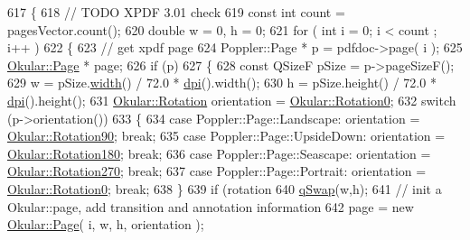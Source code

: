 \begin{DoxyCode}
617 \{
618     \textcolor{comment}{// TODO XPDF 3.01 check}
619     \textcolor{keyword}{const} \textcolor{keywordtype}{int} count = pagesVector.count();
620     \textcolor{keywordtype}{double} w = 0, h = 0;
621     \textcolor{keywordflow}{for} ( \textcolor{keywordtype}{int} i = 0; i < count ; i++ )
622     \{
623         \textcolor{comment}{// get xpdf page}
624         Poppler::Page * p = pdfdoc->page( i );
625         \hyperlink{classOkular_1_1Page}{Okular::Page} * page;
626         \textcolor{keywordflow}{if} (p)
627         \{
628             \textcolor{keyword}{const} QSizeF pSize = p->pageSizeF();
629             w = pSize.\hyperlink{classOkular_1_1Page_a57114e88281da2a51b1bb0d5d4996d53}{width}() / 72.0 * \hyperlink{classOkular_1_1Generator_ad3dd14822e3f5c9d1785008a207f34fb}{dpi}().width();
630             h = pSize.height() / 72.0 * \hyperlink{classOkular_1_1Generator_ad3dd14822e3f5c9d1785008a207f34fb}{dpi}().height();
631             \hyperlink{namespaceOkular_a8556d00465f61ef533c6b027669e7da6}{Okular::Rotation} orientation = \hyperlink{namespaceOkular_a8556d00465f61ef533c6b027669e7da6aa4df8fc3dd09e30520c264c8d23d89c2}{Okular::Rotation0};
632             \textcolor{keywordflow}{switch} (p->orientation())
633             \{
634             \textcolor{keywordflow}{case} Poppler::Page::Landscape: orientation = \hyperlink{namespaceOkular_a8556d00465f61ef533c6b027669e7da6a72f281f9a68957920dc968695de4363a}{Okular::Rotation90}; \textcolor{keywordflow}{break};
635             \textcolor{keywordflow}{case} Poppler::Page::UpsideDown: orientation = \hyperlink{namespaceOkular_a8556d00465f61ef533c6b027669e7da6a95c9d62f7745cb6bf5895007070e8ee9}{Okular::Rotation180}; \textcolor{keywordflow}{break};
636             \textcolor{keywordflow}{case} Poppler::Page::Seascape: orientation = \hyperlink{namespaceOkular_a8556d00465f61ef533c6b027669e7da6a01963dd547f5723a6b3975ae67090390}{Okular::Rotation270}; \textcolor{keywordflow}{break};
637             \textcolor{keywordflow}{case} Poppler::Page::Portrait: orientation = \hyperlink{namespaceOkular_a8556d00465f61ef533c6b027669e7da6aa4df8fc3dd09e30520c264c8d23d89c2}{Okular::Rotation0}; \textcolor{keywordflow}{break};
638             \}
639             \textcolor{keywordflow}{if} (rotation %
640             \hyperlink{htmlextension_8h_a6aa0d61b42274f15f4a693b0c7bea484}{qSwap}(w,h);
641             \textcolor{comment}{// init a Okular::page, add transition and annotation information}
642             page = \textcolor{keyword}{new} \hyperlink{classOkular_1_1Page}{Okular::Page}( i, w, h, orientation );

\end{DoxyCode}

